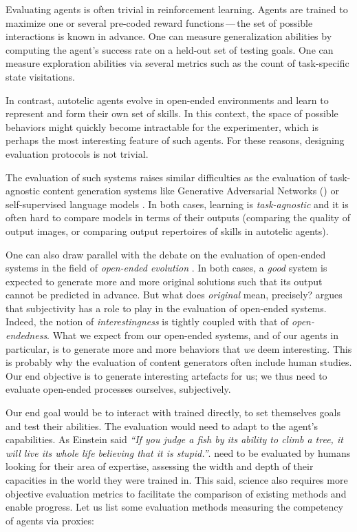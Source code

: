 Evaluating agents is often trivial in reinforcement learning. Agents are trained to maximize one or several pre-coded reward functions\,---\,the set of possible interactions is known in advance. One can measure generalization abilities by computing the agent's success rate on a held-out set of testing goals. One can measure exploration abilities via several metrics such as the count of task-specific state visitations.

In contrast, autotelic agents evolve in open-ended environments and learn to represent and form their own set of skills. In this context, the space of possible behaviors might quickly become intractable for the experimenter, which is perhaps the most interesting feature of such agents. For these reasons, designing evaluation protocols is not trivial.

The evaluation of such systems raises similar difficulties as the evaluation of task-agnostic content generation systems like Generative Adversarial Networks (\gan) \cite{goodfellow2014generative} or self-supervised language models \cite{devlin2019bert,brown2020language}. In both cases, learning is \textit{task-agnostic} and it is often hard to compare models in terms of their outputs (\eg comparing the quality of \gan output images, or comparing output repertoires of skills in autotelic agents).

One can also draw parallel with the debate on the evaluation of open-ended systems in the field of \textit{open-ended evolution} \cite{hintze_open-endedness_2019,stanley_role_2016,stanley_why_2019}. In both cases, a \textit{good} system is expected to generate more and more original solutions such that its output cannot be predicted in advance. But what does \textit{original} mean, precisely? \cite{stanley_role_2016} argues that subjectivity has a role to play in the evaluation of open-ended systems. Indeed, the notion of \textit{interestingness} is tightly coupled with that of \textit{open-endedness}. What we expect from our open-ended systems, and of our \rlimgep agents in particular, is to generate more and more behaviors that \textit{we} deem interesting. This is probably why the evaluation of content generators often include human studies. Our end objective is to generate interesting artefacts for us; we thus need to evaluate open-ended processes ourselves, subjectively.

Our end goal would be to interact with trained \rlimgep directly, to set themselves goals and test their abilities. The evaluation would need to adapt to the agent's capabilities. As Einstein said \textit{``If you judge a fish by its ability to climb a tree, it will live its whole life believing that it is stupid.''}. \rlimgep need to be evaluated by humans looking for their area of expertise, assessing the width and depth of their capacities in the world they were trained in. This said, science also requires more objective evaluation metrics to facilitate the comparison of existing methods and enable progress. Let us list some evaluation methods measuring the competency of agents via proxies:

